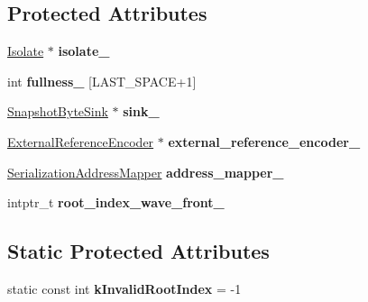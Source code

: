 \subsection*{Protected Attributes}
\begin{DoxyCompactItemize}
\item 
\hypertarget{classv8_1_1internal_1_1_serializer_a2a0bb475a79a6094294882195dd6cb86}{}\hyperlink{classv8_1_1internal_1_1_isolate}{Isolate} $\ast$ {\bfseries isolate\+\_\+}\label{classv8_1_1internal_1_1_serializer_a2a0bb475a79a6094294882195dd6cb86}

\item 
\hypertarget{classv8_1_1internal_1_1_serializer_ae11720df0f35f4f5d986f4bc1a430610}{}int {\bfseries fullness\+\_\+} \mbox{[}L\+A\+S\+T\+\_\+\+S\+P\+A\+C\+E+1\mbox{]}\label{classv8_1_1internal_1_1_serializer_ae11720df0f35f4f5d986f4bc1a430610}

\item 
\hypertarget{classv8_1_1internal_1_1_serializer_a58e895e50aa57b424f78777c8be962c0}{}\hyperlink{classv8_1_1internal_1_1_snapshot_byte_sink}{Snapshot\+Byte\+Sink} $\ast$ {\bfseries sink\+\_\+}\label{classv8_1_1internal_1_1_serializer_a58e895e50aa57b424f78777c8be962c0}

\item 
\hypertarget{classv8_1_1internal_1_1_serializer_a244733018a976bb95cfa975874e7ac48}{}\hyperlink{classv8_1_1internal_1_1_external_reference_encoder}{External\+Reference\+Encoder} $\ast$ {\bfseries external\+\_\+reference\+\_\+encoder\+\_\+}\label{classv8_1_1internal_1_1_serializer_a244733018a976bb95cfa975874e7ac48}

\item 
\hypertarget{classv8_1_1internal_1_1_serializer_ad8da92ae23e9e6b330717dc1fe50d081}{}\hyperlink{classv8_1_1internal_1_1_serialization_address_mapper}{Serialization\+Address\+Mapper} {\bfseries address\+\_\+mapper\+\_\+}\label{classv8_1_1internal_1_1_serializer_ad8da92ae23e9e6b330717dc1fe50d081}

\item 
\hypertarget{classv8_1_1internal_1_1_serializer_a4dbef78922271d012c009addadc5a118}{}intptr\+\_\+t {\bfseries root\+\_\+index\+\_\+wave\+\_\+front\+\_\+}\label{classv8_1_1internal_1_1_serializer_a4dbef78922271d012c009addadc5a118}

\end{DoxyCompactItemize}
\subsection*{Static Protected Attributes}
\begin{DoxyCompactItemize}
\item 
\hypertarget{classv8_1_1internal_1_1_serializer_a71d56f0a509fc2836698cba2433c7600}{}static const int {\bfseries k\+Invalid\+Root\+Index} = -\/1\label{classv8_1_1internal_1_1_serializer_a71d56f0a509fc2836698cba2433c7600}

\end{DoxyCompactItemize}
